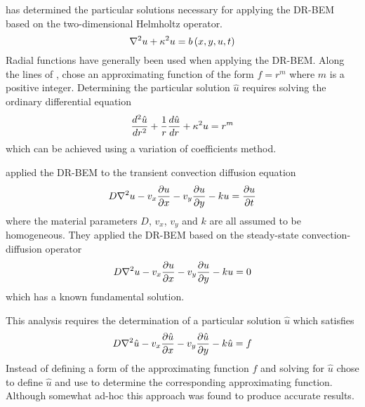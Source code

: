  has determined the particular solutions necessary for
applying the DR-BEM based on the two-dimensional Helmholtz operator.
\begin{equation}
  \laplacian{}{u} + \kappa^2 u = \fnof{b}{x,y,u,t}
\end{equation}
Radial functions have generally been used when applying the DR-BEM.  Along
the lines of ,  chose an
approximating function of the form $f = r^{m}$ where $m$ is a positive
integer.  Determining the particular solution $\hat{u}$ requires solving the
ordinary differential equation
\begin{equation}
   \dfrac{ d^{2} \hat{u}}{d {r}^{2}}  + \dfrac{1}{r}  \dfrac{ d \hat{u}}{d r}  + \kappa^2 u = r^{m}
\end{equation}
which can be achieved using a variation of coefficients method.

 applied the DR-BEM to the transient convection
diffusion equation
\begin{equation}
  D \laplacian{}{u} - v_{x} \delby{u}{x} - v_{y} \delby{u}{y} - k u = \delby{u}{t}
\end{equation}
where the material parameters $D$, $v_{x}$, $v_{y}$ and $k$ are all assumed to
be homogeneous.  They applied the DR-BEM based on the steady-state
convection-diffusion operator
\begin{equation}
  D \laplacian{}{u} - v_{x} \delby{u}{x} - v_{y} \delby{u}{y} - k u = 0
\label{eq:steadycd}
\end{equation}
which has a known fundamental solution.

This analysis requires the determination of a particular solution $\hat{u}$
which satisfies
\begin{equation}
  D \laplacian{}{\hat{u}} - v_{x} \delby{\hat{u}}{x} - v_{y} \delby{\hat{u}}{y}
  - k \hat{u} = f
\label{eq:cdpartic}
\end{equation}
Instead of defining a form of the approximating function $f$ and solving
for $\hat{u}$  chose to define $\hat{u}$ and use
 to determine the corresponding approximating function.
Although somewhat ad-hoc this approach was found to produce accurate
results.

